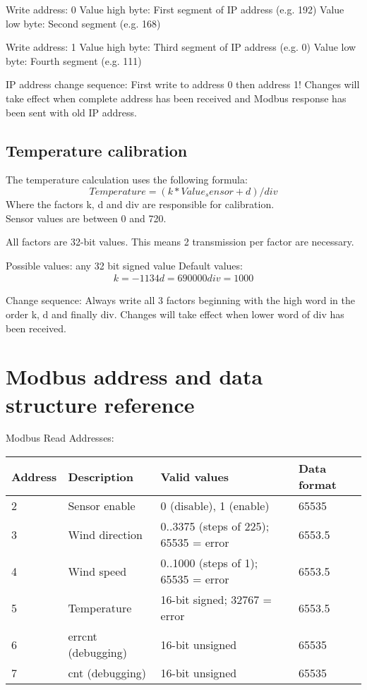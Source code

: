 Write address: 0
Value high byte: First segment of IP address (e.g. 192)
Value low byte: Second segment (e.g. 168)

Write address: 1
Value high byte: Third segment of IP address (e.g. 0)
Value low byte: Fourth segment (e.g. 111)

IP address change sequence: First write to address 0 then address 1! Changes will take effect when complete address has been received and Modbus response has been sent with old IP address.

\subsection{Temperature calibration}
The temperature calculation uses the following formula:
\[
Temperature = (k * Value_sensor + d) / div
\]
Where the factors k, d and div are responsible for calibration.\\
Sensor values are between 0 and 720.

All factors are 32-bit values. This means 2 transmission per factor are necessary.

Possible values: any 32 bit signed value
Default values:
\begin{align}
k = -1134
d = 690000
div = 1000
\end{align}

Change sequence: Always write all 3 factors beginning with the high word in the order k, d and finally div. Changes will take effect when lower word of div has been received.

\section{Modbus address and data structure reference}
\label{sec:modbus_address_ref}

Modbus Read Addresses:
\begin{tabular}{|l|l|l|l|}
\hline \textbf{Address} & \textbf{Description} & \textbf{Valid values} & \textbf{Data format} \\ 
\hline
\hline 2 & Sensor enable & 0 (disable), 1 (enable) & 65535 \\ 
\hline 3 & Wind direction & 0..3375 (steps of 225); 65535 = error & 6553.5 \\ 
\hline 4 & Wind speed & 0..1000 (steps of 1); 65535 = error & 6553.5 \\ 
\hline 5 & Temperature & 16-bit signed; 32767 = error & 6553.5 \\ 
\hline 6 & errcnt (debugging) & 16-bit unsigned & 65535 \\ 
\hline 7 & cnt (debugging) & 16-bit unsigned & 65535 \\ 
\hline 
\end{tabular} 

